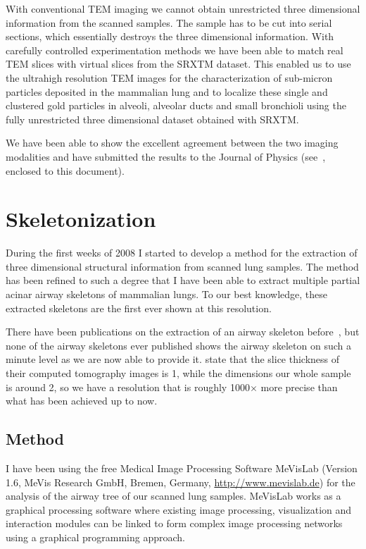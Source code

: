 \documentclass[]{scrartcl}
\begin{document}
With conventional TEM imaging we cannot obtain unrestricted three dimensional information from the scanned samples. The sample has to be cut into serial sections, which essentially destroys the three dimensional information. With carefully controlled experimentation methods we have been able to match real TEM slices with virtual slices from the SRXTM dataset. This enabled us to use the ultrahigh resolution TEM images for the characterization of sub-micron particles deposited in the mammalian lung and to localize these single and clustered gold particles in alveoli, alveolar ducts and small bronchioli using the fully unrestricted three dimensional dataset obtained with SRXTM.

We have been able to show the excellent agreement between the two imaging modalities and have submitted the results to the Journal of Physics (see~\cite{Haberthuer2009}, enclosed to this document).

\section{Skeletonization}
\label{sec:skeletonization}
During the first weeks of 2008 I started to develop a method for the extraction of three dimensional structural information from scanned lung samples. The method has been refined to such a degree that I have been able to extract multiple partial acinar airway skeletons of mammalian lungs. To our best knowledge, these extracted skeletons are the first ever shown at this resolution. 

There have been publications on the extraction of an airway skeleton before~\cite{Hasegawa2006,Sauret1999,Suter2004}, but none of the airway skeletons ever published shows the airway skeleton on such a minute level as we are now able to provide it. \citet{Sauret1999} state that the slice thickness of their computed tomography images is \unit{1}{\milli\meter}, while the dimensions our whole sample is around \unit{2}{\milli\meter}, so we have a resolution that is roughly 1000$\times$ more precise than what has been achieved up to now.

\subsection{Method}
I have been using the free Medical Image Processing Software MeVisLab (Version 1.6, MeVis Research GmbH, Bremen, Germany, \url{http://www.mevislab.de}) for the analysis of the airway tree of our scanned lung samples. MeVisLab works as a graphical processing software where existing image processing, visualization and interaction modules can be linked to form complex image processing networks using a graphical programming approach. %
\end{document}
